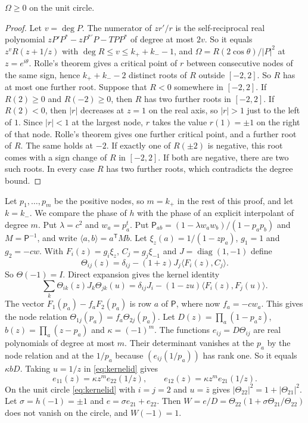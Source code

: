\begin{lemma}\label{lem:contact}
$\Omega\ge0$ on the unit circle.
\end{lemma}

\begin{proof}
Let $v=\deg P$. The numerator of $zr'/r$ is the self-reciprocal real polynomial $zP'P^*-zP^{*\prime}P-TPP^*$ of
degree at most $2v$. So it equals $z^vR(z+1/z)$ with $\deg R\le v\le k_++k_--1$, and $\Omega=R(2\cos\theta)/|P|^2$
at $z=e^{i\theta}$. Rolle's theorem gives a critical point of $r$ between consecutive nodes of the same sign,
hence $k_++k_--2$ distinct roots of $R$ outside $[-2,2]$. So $R$ has at most one further root. Suppose that $R<0$
somewhere in $[-2,2]$. If $R(2)\ge0$ and $R(-2)\ge0$, then $R$ has two further roots in $[-2,2]$. If $R(2)<0$, then
$|r|$ decreases at $z=1$ on the real axis, so $|r|>1$ just to the left of $1$. Since $|r|<1$ at the largest node,
$r$ takes the value $r(1)=\pm1$ on the right of that node. Rolle's theorem gives one further critical point,
and a further root of $R$. The same holds at $-2$. If exactly one of $R(\pm2)$ is negative, this root comes with a sign
change of $R$ in $[-2,2]$. If both are negative, there are two such roots. In every case $R$ has two further roots,
which contradicts the degree bound.
\end{proof}

Let $p_1,\ldots,p_m$ be the positive nodes, so $m=k_+$ in the rest of this proof, and let $k=k_-$. We compare the
phase of $h$ with the phase of an explicit interpolant of degree $m$. Put $\lambda=c^2$ and $w_a=p_a^t$. Put
$\mathsf P_{ab}=(1-\lambda w_aw_b)/(1-p_ap_b)$ and $M=\mathsf P^{-1}$, and write $\langle a,b\rangle=a^{\mathsf T}Mb$. Let
$\xi_z(a)=1/(1-zp_a)$, $g_1=1$ and $g_2=-cw$. With $F_i(z)=g_i\xi_z$, $C_j=g_j\xi_{-1}$ and $J=\operatorname{diag}(1,-1)$ define
\[
 \Theta_{ij}(z)=\delta_{ij}-(1+z)J_j\langle F_i(z),C_j\rangle .
\]
So $\Theta(-1)=I$. Direct expansion gives the kernel identity
\begin{equation}\label{eq:kernelid}
 \sum_k\Theta_{ik}(z)J_k\Theta_{jk}(u)=\delta_{ij}J_i-(1-zu)\langle F_i(z),F_j(u)\rangle .
\end{equation}
The vector $F_1(p_a)-f_aF_2(p_a)$ is row $a$ of $\mathsf P$, where now $f_a=-cw_a$. This gives the node relation
$\Theta_{1j}(p_a)=f_a\Theta_{2j}(p_a)$. Let $D(z)=\prod_a(1-p_az)$, $b(z)=\prod_a(z-p_a)$ and
$\kappa=(-1)^m$. The functions $e_{ij}=D\Theta_{ij}$ are real polynomials of degree at most $m$. Their
determinant vanishes at the $p_a$ by the node relation and at the $1/p_a$ because $(e_{ij}(1/p_a))$ has rank one.
So it equals $\kappa bD$. Taking $u=1/z$ in \eqref{eq:kernelid} gives
\[
 e_{11}(z)=\kappa z^me_{22}(1/z),\qquad e_{12}(z)=\kappa z^me_{21}(1/z).
\]
On the unit circle \eqref{eq:kernelid} with $i=j=2$ and $u=\bar z$ gives $|\Theta_{22}|^2=1+|\Theta_{21}|^2$. Let
$\sigma=h(-1)=\pm1$ and $e=\sigma e_{21}+e_{22}$. Then $W=e/D=\Theta_{22}(1+\sigma\Theta_{21}/\Theta_{22})$ does not
vanish on the circle, and $W(-1)=1$.

